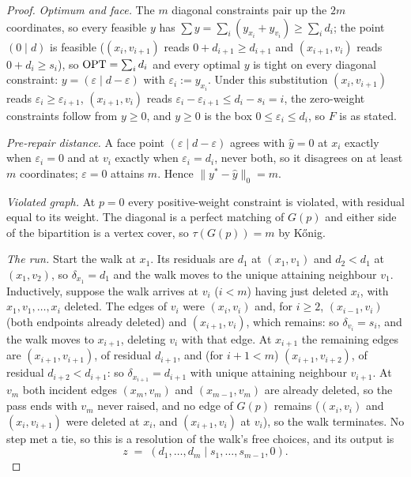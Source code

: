 \begin{proof}
\emph{Optimum and face.} The $m$ diagonal constraints pair up the $2m$ coordinates, so
every feasible $y$ has $\sum y = \sum_i (y_{x_i} + y_{v_i}) \ge \sum_i d_i$; the point
$(0 \mid d)$ is feasible ($(x_i, v_{i+1})$ reads $0 + d_{i+1} \ge d_{i+1}$ and
$(x_{i+1}, v_i)$ reads $0 + d_i \ge s_i$), so $\mathrm{OPT} = \sum_i d_i$ and every optimal $y$
is tight on every diagonal constraint: $y = (\varepsilon \mid d - \varepsilon)$ with
$\varepsilon_i := y_{x_i}$. Under this substitution $(x_i, v_{i+1})$ reads
$\varepsilon_i \ge \varepsilon_{i+1}$, $(x_{i+1}, v_i)$ reads
$\varepsilon_i - \varepsilon_{i+1} \le d_i - s_i = i$, the zero-weight constraints follow
from $y \ge 0$, and $y \ge 0$ is the box $0 \le \varepsilon_i \le d_i$, so $F$ is as
stated.

\emph{Pre-repair distance.} A face point $(\varepsilon \mid d - \varepsilon)$ agrees with
$\hat y = 0$ at $x_i$ exactly when $\varepsilon_i = 0$ and at $v_i$ exactly when
$\varepsilon_i = d_i$, never both, so it disagrees on at least $m$ coordinates;
$\varepsilon = 0$ attains $m$. Hence $\|y^* - \hat y\|_0 = m$.

\emph{Violated graph.} At $p = 0$ every positive-weight constraint is violated, with
residual equal to its weight. The diagonal is a perfect matching of $G(p)$ and either
side of the bipartition is a vertex cover, so $\tau(G(p)) = m$ by K\H{o}nig.

\emph{The run.} Start the walk at $x_1$. Its residuals are $d_1$ at $(x_1, v_1)$ and
$d_2 < d_1$ at $(x_1, v_2)$, so $\delta_{x_1} = d_1$ and the walk moves to the unique
attaining neighbour $v_1$. Inductively, suppose the walk arrives at $v_i$ ($i < m$)
having just deleted $x_i$, with $x_1, v_1, \dots, x_i$ deleted. The edges of $v_i$ were
$(x_i, v_i)$ and, for $i \ge 2$, $(x_{i-1}, v_i)$ (both endpoints already deleted)
and $(x_{i+1}, v_i)$, which remains: so $\delta_{v_i} = s_i$, and the walk moves to
$x_{i+1}$, deleting $v_i$ with that edge. At $x_{i+1}$ the remaining edges are
$(x_{i+1}, v_{i+1})$, of residual $d_{i+1}$, and (for $i + 1 < m$)
$(x_{i+1}, v_{i+2})$, of residual $d_{i+2} < d_{i+1}$: so $\delta_{x_{i+1}} = d_{i+1}$
with unique attaining neighbour $v_{i+1}$. At $v_m$ both incident edges
$(x_m, v_m)$ and $(x_{m-1}, v_m)$ are already deleted, so the pass ends with $v_m$ never
raised, and no edge of $G(p)$ remains ($(x_i, v_i)$ and $(x_i, v_{i+1})$
were deleted at $x_i$, and $(x_{i+1}, v_i)$ at $v_i$), so the walk terminates. No step
met a tie, so this is a resolution of the walk's free choices, and its output is
\[
  z \;=\; (d_1, \dots, d_m \mid s_1, \dots, s_{m-1}, 0).
\]


\end{proof}

